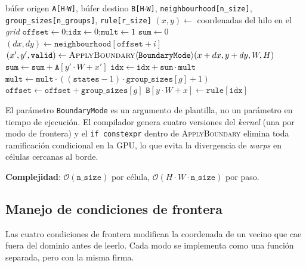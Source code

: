 \begin{breakablealgorithm}
\caption{stepKernel$\langle$\texttt{BoundaryMode}$\rangle$: un paso de evolución del autómata celular}
\label{alg:step-ca}
\begin{algorithmic}[1]
\Require búfer origen \texttt{A[H$\cdot$W]}, búfer destino \texttt{B[H$\cdot$W]}, \texttt{neighbourhood[n\_size]}, \texttt{group\_sizes[n\_groups]}, \texttt{rule[r\_size]}
\State $(x, y) \gets$ coordenadas del hilo en el \textit{grid}
 \State \Return \EndIf
\State $\texttt{offset} \gets 0$;\quad $\texttt{idx} \gets 0$;\quad $\texttt{mult} \gets 1$
    \State $\texttt{sum} \gets 0$
        \State $(dx, dy) \gets \texttt{neighbourhood}[\texttt{offset} + i]$
        \State $(x', y', \texttt{valid}) \gets \textsc{ApplyBoundary}\langle\texttt{BoundaryMode}\rangle(x + dx, y + dy, W, H)$
            \State $\texttt{sum} \gets \texttt{sum} + \texttt{A}[y' \cdot W + x']$
        \EndIf
    \EndFor
    \State $\texttt{idx} \gets \texttt{idx} + \texttt{sum} \cdot \texttt{mult}$
    \State $\texttt{mult} \gets \texttt{mult} \cdot ((\texttt{states} - 1) \cdot \texttt{group\_sizes}[g] + 1)$
    \State $\texttt{offset} \gets \texttt{offset} + \texttt{group\_sizes}[g]$
\EndFor
\State $\texttt{B}[y \cdot W + x] \gets \texttt{rule}[\texttt{idx}]$
\end{algorithmic}
\end{breakablealgorithm}

El parámetro \texttt{BoundaryMode} es un argumento de plantilla, no un parámetro en tiempo de ejecución. El compilador genera cuatro versiones del \textit{kernel} (una por modo de frontera) y el \texttt{if constexpr} dentro de \textsc{ApplyBoundary} elimina toda ramificación condicional en la GPU, lo que evita la divergencia de \textit{warps} en células cercanas al borde.

\textbf{Complejidad}: $\mathcal{O}(\texttt{n\_size})$ por célula, $\mathcal{O}(H \cdot W \cdot \texttt{n\_size})$ por paso.

\subsection{Manejo de condiciones de frontera}

Las cuatro condiciones de frontera modifican la coordenada de un vecino que cae fuera del dominio antes de leerlo. Cada modo se implementa como una función separada, pero con la misma firma.

